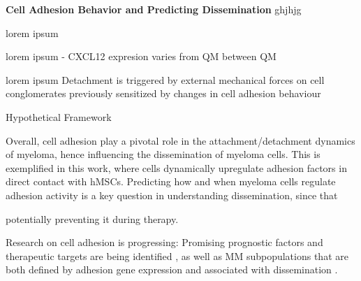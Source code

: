 \textbf{Cell Adhesion Behavior and Predicting Dissemination}
ghjhjg


\unnsubsection{\caddadaptabilitytitle}%
\label{sec:discussion_caddadaptability}%
lorem ipsum


\unnsubsection{\cadddiversitytitle}%
\label{sec:discussion_cadddiversity}%
lorem ipsum
- CXCL12 expresion varies from QM between QM


\unnsubsection{\caddtriggertitle}%
\label{sec:discussion_caddtrigger}%
lorem ipsum
Detachment is triggered by external mechanical forces on cell
conglomerates previously sensitized by changes in cell adhesion behaviour




Hypothetical Framework




Overall, cell adhesion play a pivotal role in the attachment/detachment dynamics of
myeloma, hence influencing the dissemination of myeloma cells. This is
exemplified in this work, where \INA cells dynamically upregulate adhesion
factors in direct contact with \acp{hMSC}. Predicting how and when myeloma cells
regulate adhesion activity is a key question in understanding dissemination,
since that

potentially preventing it during therapy.

Research on cell adhesion is progressing:
Promising prognostic factors and therapeutic targets are being identified
\cite{mrozikTherapeuticTargetingNcadherin2015,
      solimandoJAMAPrognosticFactor2018}, as well as MM subpopulations that are both
defined by adhesion gene expression and associated with dissemination
\cite{akhmetzyanovaDynamicCD138Surface2020,
      brandlJunctionalAdhesionMolecule2022}.


